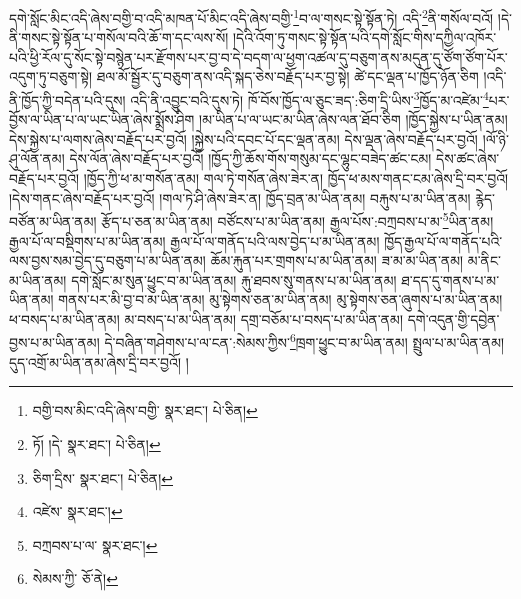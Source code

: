 དགེ་སློང་མིང་འདི་ཞེས་བགྱི་བ་འདི་མཁན་པོ་མིང་འདི་ཞེས་བགྱི་\footnote{བགྱི་བས་མིང་འདི་ཞེས་བགྱི་  སྣར་ཐང་།  པེ་ཅིན། }བ་ལ་གསང་སྟེ་སྟོན་ཏེ། འདི་\footnote{ཏོ། །དེ་  སྣར་ཐང་།  པེ་ཅིན། }ནི་གསོལ་བའོ། །དེ་ནི་གསང་སྟེ་སྟོན་པ་གསོལ་བའི་ཆོ་ག་དང་ལས་སོ། །དེའི་འོག་ཏུ་གསང་སྟེ་སྟོན་པའི་དགེ་སློང་གིས་དཀྱིལ་འཁོར་པའི་ཕྱི་རོལ་དུ་སོང་སྟེ་བསྙེན་པར་རྫོགས་པར་བྱ་བ་དེ་བདག་ལ་ཕྱག་འཚལ་དུ་བཅུག་ནས་མདུན་དུ་ཙོག་ཙོག་པོར་འདུག་ཏུ་བཅུག་སྟེ། ཐལ་མོ་སྦྱོར་དུ་བཅུག་ནས་འདི་སྐད་ཅེས་བརྗོད་པར་བྱ་སྟེ། ཚེ་དང་ལྡན་པ་ཁྱོད་ཉོན་ཅིག །འདི་ནི་ཁྱོད་ཀྱི་བདེན་པའི་དུས། འདི་ནི་འབྱུང་བའི་དུས་ཏེ། ཁོ་བོས་ཁྱོད་ལ་ཅུང་ཟད་:ཅིག་དྲི་ཡིས་\footnote{ཅིག་དྲིས་  སྣར་ཐང་།  པེ་ཅིན། }ཁྱོད་མ་འཛེམ་\footnote{འཛེས་  སྣར་ཐང་། }པར་བྱོས་ལ་ཡིན་པ་ལ་ཡང་ཡིན་ཞེས་སྨྲོས་ཤིག །མ་ཡིན་པ་ལ་ཡང་མ་ཡིན་ཞེས་ལན་ཐོབ་ཅིག །ཁྱོད་སྐྱེས་པ་ཡིན་ནམ། དེས་སྐྱེས་པ་ལགས་ཞེས་བརྗོད་པར་བྱའོ། །སྐྱེས་པའི་དབང་པོ་དང་ལྡན་ནམ། དེས་ལྡན་ཞེས་བརྗོད་པར་བྱའོ། །ལོ་ཉི་ཤུ་ལོན་ནམ། དེས་ལོན་ཞེས་བརྗོད་པར་བྱའོ། །ཁྱོད་ཀྱི་ཆོས་གོས་གསུམ་དང་ལྷུང་བཟེད་ཚང་ངམ། དེས་ཚང་ཞེས་བརྗོད་པར་བྱའོ། །ཁྱོད་ཀྱི་ཕ་མ་གསོན་ནམ། གལ་ཏེ་གསོན་ཞེས་ཟེར་ན། ཁྱོད་ཕ་མས་གནང་ངམ་ཞེས་དྲི་བར་བྱའོ། །དེས་གནང་ཞེས་བརྗོད་པར་བྱའོ། །གལ་ཏེ་ཤི་ཞེས་ཟེར་ན། ཁྱོད་བྲན་མ་ཡིན་ནམ། བརྐུས་པ་མ་ཡིན་ནམ། རྙེད་བཙོན་མ་ཡིན་ནམ། རྩོད་པ་ཅན་མ་ཡིན་ནམ། བཙོངས་པ་མ་ཡིན་ནམ། རྒྱལ་པོས་:བཀྲབས་པ་མ་\footnote{བཀྲབས་པ་ལ་  སྣར་ཐང་། }ཡིན་ནམ། རྒྱལ་པོ་ལ་བསྡིགས་པ་མ་ཡིན་ནམ། རྒྱལ་པོ་ལ་གནོད་པའི་ལས་བྱེད་པ་མ་ཡིན་ནམ། ཁྱོད་རྒྱལ་པོ་ལ་གནོད་པའི་ལས་བྱས་སམ་བྱེད་དུ་བཅུག་པ་མ་ཡིན་ནམ། ཆོམ་རྐུན་པར་གྲགས་པ་མ་ཡིན་ནམ། ཟ་མ་མ་ཡིན་ནམ། མ་ནིང་མ་ཡིན་ནམ། དགེ་སློང་མ་སུན་ཕྱུང་བ་མ་ཡིན་ནམ། རྐུ་ཐབས་སུ་གནས་པ་མ་ཡིན་ནམ། ཐ་དད་དུ་གནས་པ་མ་ཡིན་ནམ། གནས་པར་མི་བྱ་བ་མ་ཡིན་ནམ། མུ་སྟེགས་ཅན་མ་ཡིན་ནམ། མུ་སྟེགས་ཅན་ཞུགས་པ་མ་ཡིན་ནམ། ཕ་བསད་པ་མ་ཡིན་ནམ། མ་བསད་པ་མ་ཡིན་ནམ། དགྲ་བཅོམ་པ་བསད་པ་མ་ཡིན་ནམ། དགེ་འདུན་གྱི་དབྱེན་བྱས་པ་མ་ཡིན་ནམ། དེ་བཞིན་གཤེགས་པ་ལ་ངན་:སེམས་ཀྱིས་\footnote{སེམས་ཀྱི་  ཅོ་ནེ། }ཁྲག་ཕྱུང་བ་མ་ཡིན་ནམ། སྤྲུལ་པ་མ་ཡིན་ནམ། དུད་འགྲོ་མ་ཡིན་ནམ་ཞེས་དྲི་བར་བྱའོ། །
